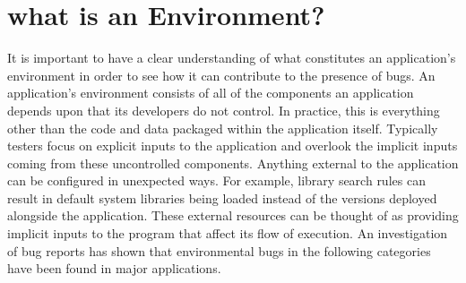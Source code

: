 \section{what is an Environment?}
\label{SEC:background}

It is important
to have a clear understanding
of what constitutes an application's environment
in order to see how it can contribute to the presence of bugs.
An application's environment consists of
all of the components an application depends upon
that its developers do not control.
In practice, this is everything other than the code and data packaged
within the application itself.
Typically testers
focus on explicit inputs to the application
and overlook the implicit inputs
coming from these uncontrolled components.
Anything external to the application can be
configured in unexpected ways.
For example, library search rules can result in default system libraries
being loaded instead of
the versions deployed alongside the application.
These external resources can be thought of as
providing implicit inputs to the program that affect its flow of execution.
An investigation of bug reports has shown that environmental bugs in the
following categories have been found in major applications.

